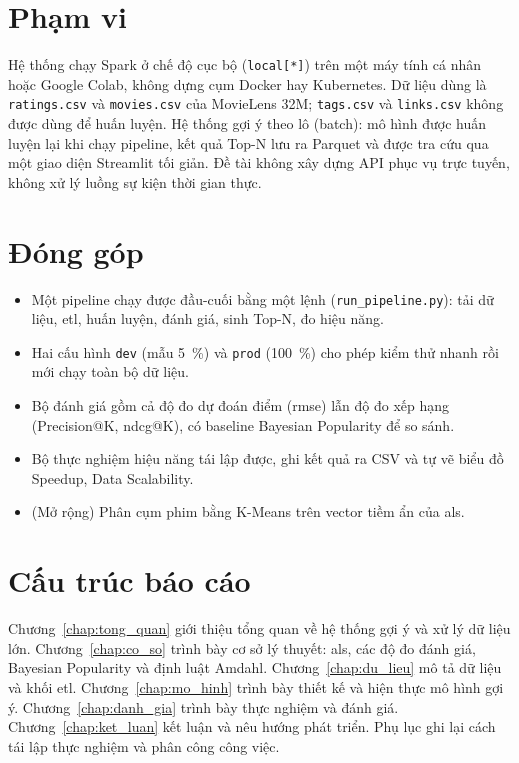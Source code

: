 \section{Phạm vi}
\label{sec:pham_vi}
Hệ thống chạy Spark ở chế độ cục bộ (\texttt{local[*]}) trên một máy tính cá nhân hoặc Google Colab, không dựng cụm Docker hay Kubernetes. Dữ liệu dùng là \texttt{ratings.csv} và \texttt{movies.csv} của MovieLens 32M; \texttt{tags.csv} và \texttt{links.csv} không được dùng để huấn luyện. Hệ thống gợi ý theo lô (batch): mô hình được huấn luyện lại khi chạy pipeline, kết quả Top-N lưu ra Parquet và được tra cứu qua một giao diện Streamlit tối giản. Đề tài không xây dựng API phục vụ trực tuyến, không xử lý luồng sự kiện thời gian thực.

\section{Đóng góp}
\label{sec:dong_gop}
\begin{itemize}
    \item Một pipeline chạy được đầu-cuối bằng một lệnh (\texttt{run\_pipeline.py}): tải dữ liệu, \gls{etl}, huấn luyện, đánh giá, sinh Top-N, đo hiệu năng.
    \item Hai cấu hình \texttt{dev} (mẫu \SI{5}{\percent}) và \texttt{prod} (\SI{100}{\percent}) cho phép kiểm thử nhanh rồi mới chạy toàn bộ dữ liệu.
    \item Bộ đánh giá gồm cả độ đo dự đoán điểm (\gls{rmse}) lẫn độ đo xếp hạng (Precision@K, \gls{ndcg}@K), có baseline Bayesian Popularity để so sánh.
    \item Bộ thực nghiệm hiệu năng tái lập được, ghi kết quả ra CSV và tự vẽ biểu đồ Speedup, Data Scalability.
    \item (Mở rộng) Phân cụm phim bằng K-Means trên vector tiềm ẩn của \gls{als}.
\end{itemize}

\section{Cấu trúc báo cáo}
\label{sec:cau_truc}
Chương~\ref{chap:tong_quan} giới thiệu tổng quan về hệ thống gợi ý và xử lý dữ liệu lớn. Chương~\ref{chap:co_so} trình bày cơ sở lý thuyết: \gls{als}, các độ đo đánh giá, Bayesian Popularity và định luật Amdahl. Chương~\ref{chap:du_lieu} mô tả dữ liệu và khối \gls{etl}. Chương~\ref{chap:mo_hinh} trình bày thiết kế và hiện thực mô hình gợi ý. Chương~\ref{chap:danh_gia} trình bày thực nghiệm và đánh giá. Chương~\ref{chap:ket_luan} kết luận và nêu hướng phát triển. Phụ lục ghi lại cách tái lập thực nghiệm và phân công công việc.
